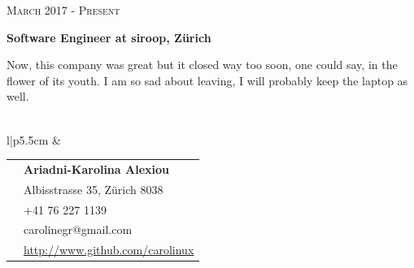 \documentclass[10pt]{article} %
\begin{document}
\begin{minipage}[t]{0.5\textwidth}
{\raggedleft\textsc{March 2017 - Present}\par}

{\raggedright\large \textbf{Software Engineer at siroop, Z\"urich}\\
}

\normalsize{Now, this company was great but it closed way too soon, one could say, in the flower of its youth. I am so sad about leaving, I will probably keep the laptop as well.}
\\
\\


\end{minipage} %
\hfill
\begin{minipage}[t]{0.44\textwidth} %
\vspace{0pt} %


\colorbox{shade}{\textcolor{text1}{
        \begin{tabular}{l|p{5.5cm}}
             &
        \begin{tabular}{l|p{5cm}}
    \raisebox{0pt}{\Smiley} & \textbf{Ariadni-Karolina Alexiou} \\ %
    \raisebox{-1pt}{\textifsymbol{18}} & Albisstrasse 35, Z\"urich 8038 \\ %
    \raisebox{-1pt}{\Mobilefone} & +41 76 227 1139\\ %
    \raisebox{-1pt}{\Letter} & carolinegr@gmail.com \\ %
    \Keyboard & \href{http://www.github.com/carolinux}{http://www.github.com/carolinux} \\ %
        \end{tabular}  \\ %
\end{tabular}
}
}\\[10pt]






\end{minipage}
\end{document}
